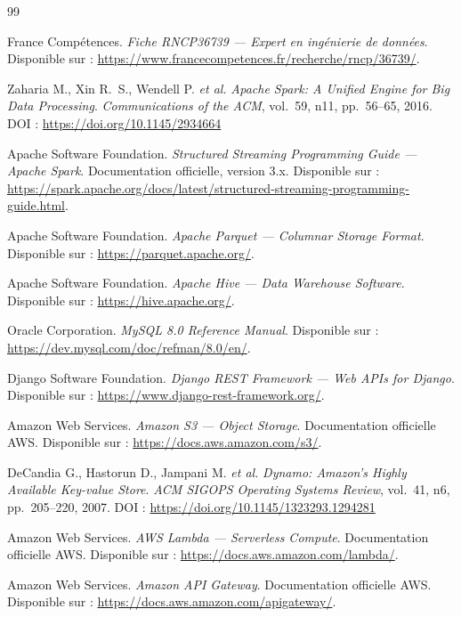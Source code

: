 \documentclass[11pt]{article}
\begin{document}
\begin{thebibliography}{99}

France Compétences.
\textit{Fiche RNCP36739 --- Expert en ingénierie de données}.
Disponible sur : \url{https://www.francecompetences.fr/recherche/rncp/36739/}.

Zaharia M., Xin R.~S., Wendell P. \textit{et al.}
\textit{Apache Spark: A Unified Engine for Big Data Processing}.
\textit{Communications of the ACM}, vol.~59, n\textdegree{}11, pp.~56--65, 2016.
DOI : \url{https://doi.org/10.1145/2934664}

Apache Software Foundation.
\textit{Structured Streaming Programming Guide --- Apache Spark}.
Documentation officielle, version 3.x.
Disponible sur : \url{https://spark.apache.org/docs/latest/structured-streaming-programming-guide.html}.

Apache Software Foundation.
\textit{Apache Parquet --- Columnar Storage Format}.
Disponible sur : \url{https://parquet.apache.org/}.

Apache Software Foundation.
\textit{Apache Hive --- Data Warehouse Software}.
Disponible sur : \url{https://hive.apache.org/}.

Oracle Corporation.
\textit{MySQL 8.0 Reference Manual}.
Disponible sur : \url{https://dev.mysql.com/doc/refman/8.0/en/}.

Django Software Foundation.
\textit{Django REST Framework --- Web APIs for Django}.
Disponible sur : \url{https://www.django-rest-framework.org/}.

Amazon Web Services.
\textit{Amazon S3 --- Object Storage}. Documentation officielle AWS.
Disponible sur : \url{https://docs.aws.amazon.com/s3/}.

DeCandia G., Hastorun D., Jampani M. \textit{et al.}
\textit{Dynamo: Amazon's Highly Available Key-value Store}.
\textit{ACM SIGOPS Operating Systems Review}, vol.~41, n\textdegree{}6,
pp.~205--220, 2007.
DOI : \url{https://doi.org/10.1145/1323293.1294281}

Amazon Web Services.
\textit{AWS Lambda --- Serverless Compute}. Documentation officielle AWS.
Disponible sur : \url{https://docs.aws.amazon.com/lambda/}.

Amazon Web Services.
\textit{Amazon API Gateway}. Documentation officielle AWS.
Disponible sur : \url{https://docs.aws.amazon.com/apigateway/}.


\end{thebibliography}
\end{document}
